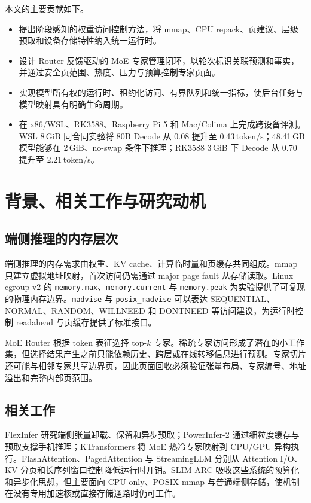 \documentclass[a4paper]{article}
\begin{document}
本文的主要贡献如下。
\begin{itemize}[leftmargin=3em]
  \item 提出阶段感知的权重访问控制方法，将 mmap、CPU repack、页建议、层级预取和设备存储特性纳入统一运行时。
  \item 设计 Router 反馈驱动的 MoE 专家管理闭环，以轮次标识关联预测和事实，并通过安全页范围、热度、压力与预算控制专家页面。
  \item 实现模型所有权的运行时、租约化访问、有界队列和统一指标，使后台任务与模型映射具有明确生命周期。
  \item 在 x86/WSL、RK3588、Raspberry Pi 5 和 Mac/Colima 上完成跨设备评测。WSL 8\,GiB 同合同实验将 80B Decode 从 0.08 提升至 0.43\,token/s；48.41\,GB 模型能够在 2\,GiB、no-swap 条件下推理；RK3588 3\,GiB 下 Decode 从 0.70 提升至 2.21\,token/s。
\end{itemize}

\newpage
\section{背景、相关工作与研究动机}

\subsection{端侧推理的内存层次}

端侧推理的内存需求由权重、KV cache、计算临时量和页缓存共同组成。mmap 只建立虚拟地址映射，首次访问仍需通过 major page fault 从存储读取。Linux cgroup v2 的 \texttt{memory.max}、\texttt{memory.current} 与 \texttt{memory.peak} 为实验提供了可复现的物理内存边界。\texttt{madvise} 与 \texttt{posix\_madvise} 可以表达 SEQUENTIAL、NORMAL、RANDOM、WILLNEED 和 DONTNEED 等访问建议，为运行时控制 readahead 与页缓存提供了标准接口。

MoE Router 根据 token 表征选择 top-$k$ 专家。稀疏专家访问形成了潜在的小工作集，但选择结果产生之前只能依赖历史、跨层或在线转移信息进行预测。专家切片还可能与相邻专家共享边界页，因此页面回收必须验证张量布局、专家编号、地址溢出和完整内部页范围。

\subsection{相关工作}

FlexInfer 研究端侧张量卸载、保留和异步预取；PowerInfer-2 通过细粒度缓存与预取支撑手机推理；KTransformers 将 MoE 热冷专家映射到 CPU/GPU 异构执行。FlashAttention、PagedAttention 与 StreamingLLM 分别从 Attention I/O、KV 分页和长序列窗口控制降低运行时开销。SLIM-ARC 吸收这些系统的预算化和异步化思想，但主要面向 CPU-only、POSIX mmap 与普通端侧存储，使机制在没有专用加速核或直接存储通路时仍可工作。
\end{document}
